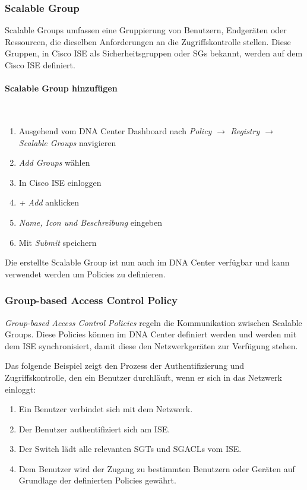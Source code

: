 \subsubsection{Scalable Group}
Scalable Groups umfassen eine Gruppierung von Benutzern, Endgeräten oder Ressourcen, die dieselben Anforderungen an die Zugriffskontrolle stellen. Diese Gruppen, in Cisco ISE als Sicherheitsgruppen oder SGs bekannt, werden auf dem Cisco ISE definiert. 

\paragraph{Scalable Group hinzufügen}
~\\
\begin{enumerate}
	\item Ausgehend vom DNA Center Dashboard nach \textit{Policy $\rightarrow$ Registry $\rightarrow$ Scalable Groups} navigieren
	\item \textit{Add Groups} wählen
	\item In Cisco ISE einloggen
	\item \textit{+ Add} anklicken
	\item \textit{Name, Icon und Beschreibung} eingeben 
	\item Mit \textit{Submit} speichern
\end{enumerate}
Die erstellte Scalable Group ist nun auch im DNA Center verfügbar und kann verwendet werden um Policies zu definieren.

\subsubsection{Group-based Access Control Policy}
\textit{Group-based Access Control Policies} regeln die Kommunikation zwischen Scalable Groups. Diese Policies können im DNA Center definiert werden und werden mit dem ISE synchronisiert, damit diese den Netzwerkgeräten zur Verfügung stehen.

Das folgende Beispiel zeigt den Prozess der Authentifizierung und Zugriffskontrolle, den ein Benutzer durchläuft, wenn er sich in das Netzwerk einloggt:
\begin{enumerate}
	\item Ein Benutzer verbindet sich mit dem Netzwerk.
	\item Der Benutzer authentifiziert sich am ISE.
	\item Der Switch lädt alle relevanten SGTs und SGACLs vom ISE.
	\item  Dem Benutzer wird der Zugang zu bestimmten Benutzern oder Geräten auf Grundlage der definierten Policies gewährt.
\end{enumerate}

